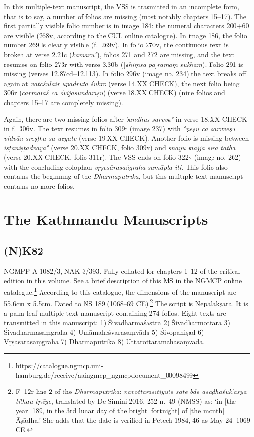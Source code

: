 \documentclass[12pt]{book}
\begin{document}
In this multiple-text manuscript, the VSS is trasmitted in an incomplete
form, that is to say, a number of folios are missing (most notably
chapters 15--17). The first partially visible folio number is in image
184: the numeral characters 200+60 are visible (268v, according to the
CUL online catalogue). In image 186, the folio number 269 is clearly
visible (f.~269v). In folio 270v, the continuous text is broken at verse
2.21c (\emph{kāmarū°}), folios 271 and 272 are missing, and the text
resumes on folio 273r with verse 3.30b ({[}\emph{ahiṃsā
pa}{]}\emph{ramaṃ} \emph{sukham}). Folio 291 is missing (verses
12.87cd--12.113). In folio 296v (image no. 234) the text breaks off
again at \emph{vātaśūlair upadrutā} \textbar{} \emph{śukro} (verse 14.XX
CHECK), the next folio being 306r (\emph{carmatāś ca dvijasundarīṣu})
(verse 18.XX CHECK) (nine folios and chapters 15--17 are completely
missing).

Again, there are two missing folios after \emph{bandhus sarvva°} in
verse 18.XX CHECK in f.~306v. The text resumes in folio 309r (image 237)
with \emph{°ṇeṣu ca sarvveṣu vidvān sreṣṭha sa ucyate} (verse 19.XX
CHECK). Another folio is missing between \emph{iṣṭāniṣṭadvaya°} (verse
20.XX CHECK, folio 309v) and \emph{snāyu majjā sirā tathā} (verse 20.XX
CHECK, folio 311r). The VSS ends on folio 322v (image no. 262) with the
concluding colophon \emph{vṛṣasārasaṅgraha samāpta iti}. This folio also
contains the beginning of the \emph{Dharmaputrikā}, but this
multiple-text manuscript contains no more folios.

{%
\section{The Kathmandu Manuscripts}\label{the-kathmandu-manuscripts}}

{%
\subsection{(N)K82}\label{nk82}}

NGMPP A 1082/3, NAK 3/393. Fully collated for chapters 1--12 of the
critical edition in this volume. See a brief description of this MS in
the NGMCP online catalogue.\footnote{https://catalogue.ngmcp.uni-hamburg.de/receive/aaingmcp\_ngmcpdocument\_00098499}
According to this catalogue, the dimensions of the manuscript are 55.6cm
x 5.5cm. Dated to NS 189 (1068--69 CE).\footnote{F. 12r line 2 of the
  \emph{Dharmaputrikā}: \emph{navottarāsītiyute sate bde āsāḍhaśuklasya
  tithau tṛtīye}, translated by De Simini 2016, 252 n.~49 (NMSS) as: `in
  {[}the year{]} 189, in the 3rd lunar day of the bright {[}fortnight{]}
  of {[}the month{]} Āṣādha.' She adds that the date is verified in
  Petech 1984, 46 as May 24, 1069 CE.} The script is Nepālākṣara. It is
a palm-leaf multiple-text manuscript containing 274 folios. Eight texts
are transmitted in this manuscript: 1) Śivadharmaśāstra 2)
Śivadharmottara 3) Śivadharmasaṃgraha 4) Umāmaheśvarasaṃvāda 5)
Śivopaniṣad 6) Vṛṣasārasaṃgraha 7) Dharmaputrikā 8)
Uttarottaramahāsaṃvāda.
\end{document}
